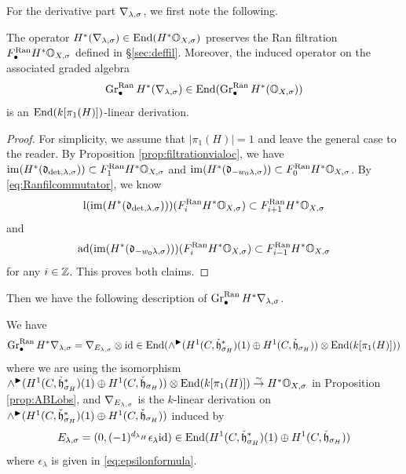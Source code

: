 \documentclass[reqno]{amsart}
\numberwithin{equation}{section}
\numberwithin{equation}{section}
\begin{document}
For the derivative part $\nabla_{\lambda,\sigma}$, we first note the following.
\begin{lemma}\label{lem:derivativepartfil}
    The operator $H^*(\nabla_{\lambda,\sigma})\in \operatorname{End}(H^*\mathbb{O}_{X,\sigma})$ preserves the Ran filtration $F_{\bullet}^{\mathrm{Ran}}H^*\mathbb{O}_{X,\sigma}$ defined in \S\ref{sec:deffil}. Moreover, the induced operator on the associated graded algebra \[\operatorname{Gr}^{\mathrm{Ran}}_{\bullet}H^*(\nabla_{\lambda,\sigma})\in \operatorname{End}(\operatorname{Gr}^{\mathrm{Ran}}_{\bullet}H^*(\mathbb{O}_{X,\sigma}))\] is an $\operatorname{End}(k[\pi_1(H)])$-linear derivation.
\end{lemma}

\begin{proof}
    For simplicity, we assume that $|\pi_1(H)|=1$ and leave the general case to the reader. By Proposition \ref{prop:filtrationvialoc}, we have $\mathrm{im}(H^*(\mathfrak{d}_{\det,\lambda,\sigma}))\subset F_1^{\mathrm{Ran}}H^*\mathbb{O}_{X,\sigma}$ and $\mathrm{im}(H^*(\mathfrak{d}_{-w_0\lambda,\sigma}))\subset F_0^{\mathrm{Ran}}H^*\mathbb{O}_{X,\sigma}$. By \eqref{eq:Ranfilcommutator}, we know \[\mathrm{l}(\mathrm{im}(H^*(\mathfrak{d}_{\det,\lambda,\sigma})))(F_i^{\mathrm{Ran}}H^*\mathbb{O}_{X,\sigma})\subset F_{i+1}^{\mathrm{Ran}}H^*\mathbb{O}_{X,\sigma}\] and \[\mathrm{ad}(\mathrm{im}(H^*(\mathfrak{d}_{-w_0\lambda,\sigma})))(F_i^{\mathrm{Ran}}H^*\mathbb{O}_{X,\sigma})\subset F_{i-1}^{\mathrm{Ran}}H^*\mathbb{O}_{X,\sigma}\] for any $i\in \mathbb{Z}$. This proves both claims.
\end{proof}

Then we have the following description of $\operatorname{Gr}^{\mathrm{Ran}}_{\bullet}H^*\nabla_{\lambda,\sigma}$.
\begin{prop}\label{prop:derivativepart}
    We have \[\operatorname{Gr}^{\mathrm{Ran}}_{\bullet}H^*\nabla_{\lambda,\sigma}=\nabla_{E_{\lambda,\sigma}}\otimes \mathrm{id}\in \operatorname{End}(\wedge^{\blacktriangleright}(H^1(C,\check{\mathfrak{h}}_{\sigma_H}^*)(1)\oplus H^1(C,\check{\mathfrak{h}}_{\sigma_H}))\otimes \operatorname{End}(k[\pi_1(H)]))\] where we are using the isomorphism $\wedge^{\blacktriangleright}(H^1(C,\check{\mathfrak{h}}_{\sigma_H}^*)(1)\oplus H^1(C,\check{\mathfrak{h}}_{\sigma_H}))\otimes \operatorname{End}(k[\pi_1(H)])\stackrel{\sim}{\to} H^*\mathbb{O}_{X,\sigma}$ in Proposition \ref{prop:ABLobs}, and $\nabla_{E_{\lambda,\sigma}}$ is the $k$-linear derivation on $\wedge^{\blacktriangleright}(H^1(C,\check{\mathfrak{h}}_{\sigma_H}^*)(1)\oplus H^1(C,\check{\mathfrak{h}}_{\sigma_H}))$ induced by \[E_{\lambda,\sigma}=(0, (-1)^{d_{\lambda_H} }\epsilon_{\lambda}\mathrm{id})\in \operatorname{End}(H^1(C,\check{\mathfrak{h}}_{\sigma_H}^*)(1)\oplus H^1(C,\check{\mathfrak{h}}_{\sigma_H}))\] where $\epsilon_{\lambda}$ is given in \eqref{eq:epsilonformula}.
\end{prop}
\end{document}
